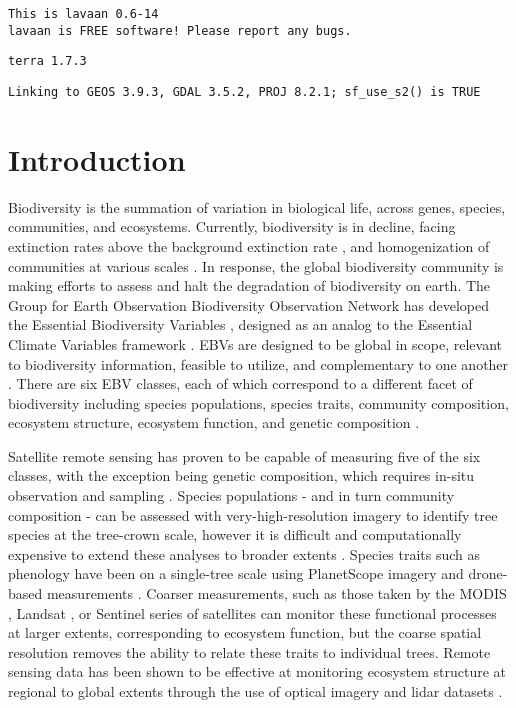 \documentclass[
  authoryear,
  review,
  3p,
  twocolumn]{elsarticle}
\begin{document}
\begin{verbatim}
This is lavaan 0.6-14
lavaan is FREE software! Please report any bugs.
\end{verbatim}

\begin{verbatim}
terra 1.7.3
\end{verbatim}

\begin{verbatim}
Linking to GEOS 3.9.3, GDAL 3.5.2, PROJ 8.2.1; sf_use_s2() is TRUE
\end{verbatim}

\hypertarget{introduction}{%
\section{Introduction}\label{introduction}}

Biodiversity is the summation of variation in biological life, across
genes, species, communities, and ecosystems. Currently, biodiversity is
in decline, facing extinction rates above the background extinction rate
\citep{thomas2004, urban2015}, and homogenization of communities at
various scales \citep{mcgill2015}. In response, the global biodiversity
community is making efforts to assess and halt the degradation of
biodiversity on earth. The Group for Earth Observation Biodiversity
Observation Network has developed the Essential Biodiversity Variables
\citep[EBVs,][]{pereira2013}, designed as an analog to the Essential
Climate Variables framework \citep{bojinski2014}. EBVs are designed to
be global in scope, relevant to biodiversity information, feasible to
utilize, and complementary to one another \citep{skidmore2021}. There
are six EBV classes, each of which correspond to a different facet of
biodiversity including species populations, species traits, community
composition, ecosystem structure, ecosystem function, and genetic
composition \citep{pereira2013}.

Satellite remote sensing has proven to be capable of measuring five of
the six classes, with the exception being genetic composition, which
requires in-situ observation and sampling \citep{skidmore2021}. Species
populations - and in turn community composition - can be assessed with
very-high-resolution imagery to identify tree species at the tree-crown
scale, however it is difficult and computationally expensive to extend
these analyses to broader extents \citep{fassnacht2016, graves2016}.
Species traits such as phenology have been on a single-tree scale using
PlanetScope imagery and drone-based measurements \citep{wu2021}. Coarser
measurements, such as those taken by the MODIS \citep{zhang2003},
Landsat \citep{fisher2006}, or Sentinel
\citep{helfenstein2022, darvishzadeh2019} series of satellites can
monitor these functional processes at larger extents, corresponding to
ecosystem function, but the coarse spatial resolution removes the
ability to relate these traits to individual trees. Remote sensing data
has been shown to be effective at monitoring ecosystem structure at
regional to global extents through the use of optical imagery
\citep{cohen2004} and lidar datasets
\citep{lefsky2002, lang2021, neuenschwander2019}.
\end{document}
